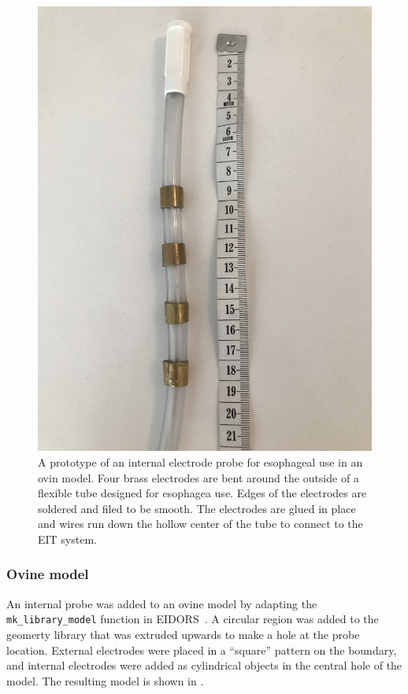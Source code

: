 \begin{figure}
    \centering
	\includegraphics[width=\textwidth, angle =-90]{chapter7-internal_elec_motion/imgs/probe_prototype.jpg} 
	\caption[Probe prototype]{\label{fig:probe_design} 
	A prototype of an internal electrode probe for esophageal use in an ovin model.
	Four brass electrodes are bent around the outside of a flexible tube designed for
	esophagea use. Edges of the electrodes are soldered and filed to be smooth. 
	The electrodes are glued in place and wires run down the hollow center
	of the tube to connect to the EIT system.}
 \end{figure}

\subsubsection{Ovine model}
An internal probe was added to an ovine model by adapting the 
\verb!mk_library_model!
function in EIDORS~\parencite{adler_eidors_2017}. A circular region was added to the
geomerty library that was extruded upwards to make a hole at the probe location. 
External electrodes were placed in a ``square'' pattern on the boundary, and internal
electrodes were added as cylindrical objects in the central hole of the model.
The resulting model is shown in .

